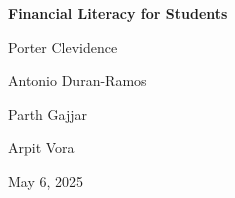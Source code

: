 \begin{titlepage}
    \centering
    \vspace*{6cm} 

    {\Huge \textbf{Financial Literacy for Students}\par}

    \vspace{1.5cm} 
    {\large Porter Clevidence\par}
    {\large Antonio Duran-Ramos\par}
    {\large Parth Gajjar\par}
    {\large Arpit Vora\par}

    \vfill 
    {\large May 6, 2025}
\end{titlepage}

